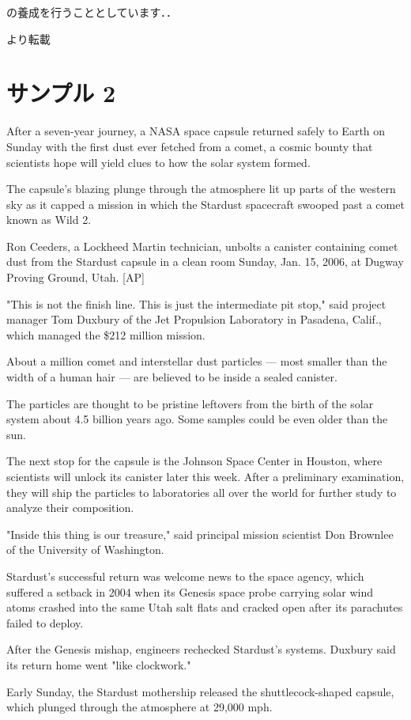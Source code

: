 \documentclass[a4j,9pt,twocolumn,dvipdfmx]{jsarticle}
\begin{document}
の養成を行うこととしています．．\hfill{\cite{www1}より転載

\section{サンプル 2}
After a seven-year journey, a NASA space capsule returned safely to
Earth on Sunday with the first dust ever fetched from a comet, a cosmic
bounty that scientists hope will yield clues to how the solar system
formed.

The capsule's blazing plunge through the atmosphere lit up parts of the
western sky as it capped a mission in which the Stardust spacecraft
swooped past a comet known as Wild 2.

Ron Ceeders, a Lockheed Martin technician, unbolts a canister containing
comet dust from the Stardust capsule in a clean room Sunday, Jan. 15,
2006, at Dugway Proving Ground, Utah. [AP]

"This is not the finish line. This is just the intermediate pit stop,"
said project manager Tom Duxbury of the Jet Propulsion Laboratory in
Pasadena, Calif., which managed the \$212 million mission.

About a million comet and interstellar dust particles --- most
smaller than the width of a human hair --- are believed to be inside
a sealed canister.

The particles are thought to be pristine leftovers from the birth of the
solar system about 4.5 billion years ago. Some samples could be even
older than the sun.

The next stop for the capsule is the Johnson Space Center in Houston,
where scientists will unlock its canister later this week. After a
preliminary examination, they will ship the particles to laboratories
all over the world for further study to analyze their composition.

"Inside this thing is our treasure," said principal mission scientist
Don Brownlee of the University of Washington.

Stardust's successful return was welcome news to the space agency, which
suffered a setback in 2004 when its Genesis space probe carrying solar
wind atoms crashed into the same Utah salt flats and cracked open after
its parachutes failed to deploy.

After the Genesis mishap, engineers rechecked Stardust's
systems. Duxbury said its return home went "like clockwork."

Early Sunday, the Stardust mothership released the shuttlecock-shaped
capsule, which plunged through the atmosphere at 29,000
mph.

}
\end{document}
